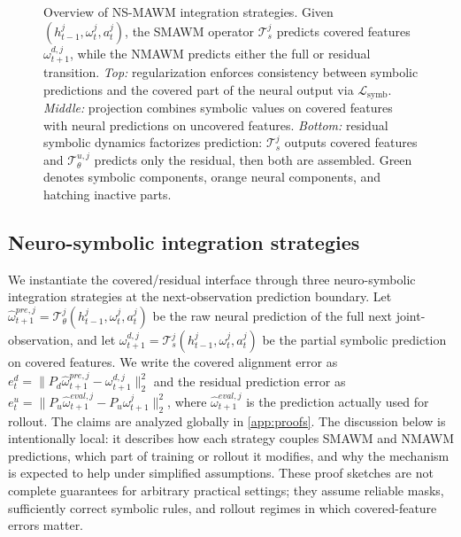 \documentclass{article}
\theoremstyle{plain}
\theoremstyle{definition}
\theoremstyle{remark}
\begin{document}
\begin{figure}[h!]
  \centering
  \resizebox{0.6\columnwidth}{!}{%
    
  }
  \caption{
  Overview of NS-MAWM integration strategies.
  Given $(h^j_{t-1},\omega^j_t,a^j_t)$, the SMAWM operator $\mathcal{T}^j_s$ predicts covered features $\omega^{d,j}_{t+1}$, while the NMAWM predicts either the full or residual transition.
  \emph{Top:} regularization enforces consistency between symbolic predictions and the covered part of the neural output via $\mathcal{L}_{\mathrm{symb}}$.
  \emph{Middle:} projection combines symbolic values on covered features with neural predictions on uncovered features.
  \emph{Bottom:} residual symbolic dynamics factorizes prediction: $\mathcal{T}^j_s$ outputs covered features and $\mathcal{T}^{u,j}_{\theta}$ predicts only the residual, then both are assembled.
  Green denotes symbolic components, orange neural components, and hatching inactive parts.
  }
  \label{fig:ns-mawm_overview}
\end{figure}

\subsection{Neuro-symbolic integration strategies}
\label{sec:strategies}

We instantiate the covered/residual interface through three neuro-symbolic integration strategies at the next-observation prediction boundary.
Let $\hat{\omega}^{pre,j}_{t+1} = \mathcal{T}^j_{\theta}(h^j_{t-1}, \omega^j_t, a^j_t)$
be the raw neural prediction of the full next joint-observation, and let
$\omega^{d,j}_{t+1} = \mathcal{T}^j_s(h^j_{t-1}, \omega^j_t, a^j_t)$
be the partial symbolic prediction on covered features.
We write the covered alignment error as
$e^d_t=\|P_d\hat{\omega}^{pre,j}_{t+1}-\omega^{d,j}_{t+1}\|_2^2$
and the residual prediction error as
$e^u_t=\|P_u\hat{\omega}^{eval,j}_{t+1}-P_u\omega^j_{t+1}\|_2^2$,
where $\hat{\omega}^{eval,j}_{t+1}$ is the prediction actually used for rollout.
The claims are analyzed globally in \autoref{app:proofs}. The discussion below is intentionally local: it describes how each strategy couples SMAWM and NMAWM predictions, which part of training or rollout it modifies, and why the mechanism is expected to help under simplified assumptions. These proof sketches are not complete guarantees for arbitrary practical settings; they assume reliable masks, sufficiently correct symbolic rules, and rollout regimes in which covered-feature errors matter.
\end{document}
